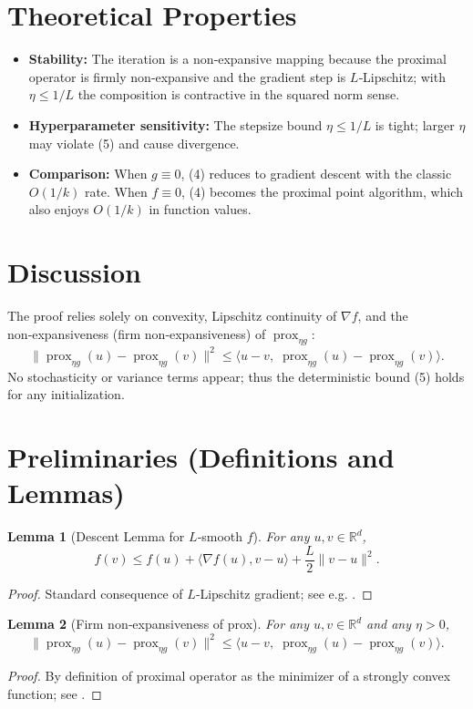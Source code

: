 \documentclass{article}
\newtheorem{lemma}{Lemma}
\newcommand{\prox}{\operatorname{prox}}
\begin{document}
\section*{Theoretical Properties}
\begin{itemize}
\item \textbf{Stability:} The iteration is a non‑expansive mapping because the proximal operator is firmly non‑expansive and the gradient step is $L$‑Lipschitz; with $\eta\le1/L$ the composition is contractive in the squared norm sense.
\item \textbf{Hyperparameter sensitivity:} The stepsize bound $\eta\le1/L$ is tight; larger $\eta$ may violate (5) and cause divergence.
\item \textbf{Comparison:} When $g\equiv0$, (4) reduces to gradient descent with the classic $O(1/k)$ rate. When $f\equiv0$, (4) becomes the proximal point algorithm, which also enjoys $O(1/k)$ in function values.
\end{itemize}

\section*{Discussion}
The proof relies solely on convexity, Lipschitz continuity of $\nabla f$, and the non‑expansiveness (firm non‑expansiveness) of $\prox_{\eta g}$:
\[
\|\prox_{\eta g}(u)-\prox_{\eta g}(v)\|^{2}
\le \langle u-v,\;\prox_{\eta g}(u)-\prox_{\eta g}(v)\rangle .
\tag{6}
\]
No stochasticity or variance terms appear; thus the deterministic bound (5) holds for any initialization.

\newpage

\section*{Preliminaries (Definitions and Lemmas)}
\begin{lemma}[Descent Lemma for $L$‑smooth $f$]\label{lem:descent}
For any $u,v\in\mathbb{R}^{d}$,
\[
f(v)\le f(u)+\langle\nabla f(u),v-u\rangle+\frac{L}{2}\|v-u\|^{2}.
\tag{7}
\]
\end{lemma}
\begin{proof}
Standard consequence of $L$‑Lipschitz gradient; see e.g. \cite{nesterov2004intro}.
\end{proof}

\begin{lemma}[Firm non‑expansiveness of prox]\label{lem:prox}
For any $u,v\in\mathbb{R}^{d}$ and any $\eta>0$,
\[
\|\prox_{\eta g}(u)-\prox_{\eta g}(v)\|^{2}
\le \langle u-v,\;\prox_{\eta g}(u)-\prox_{\eta g}(v)\rangle .
\tag{8}
\]
\end{lemma}
\begin{proof}
By definition of proximal operator as the minimizer of a strongly convex function; see \cite{parikh2014proximal}.
\end{proof}
\end{document}

